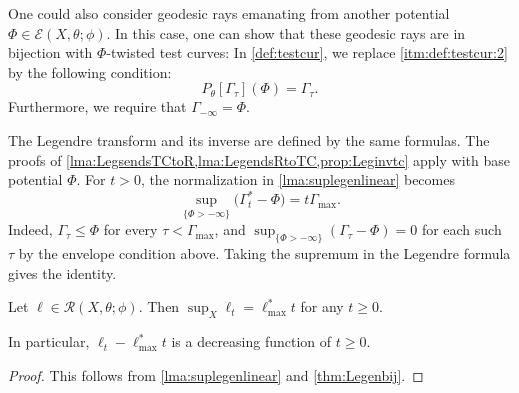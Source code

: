 \begin{remark}\label{rmk:testcurve:L815}
    One could also consider geodesic rays emanating from another potential $\Phi \in \mathcal{E}(X,\theta;\phi)$. In this case, one can show that these geodesic rays are in bijection with $\Phi$-twisted test curves: In \cref{def:testcur}, we replace \ref{itm:def:testcur:2} by the following condition:
    \[
        P_{\theta}\left[\Gamma_{\tau}\right](\Phi)=\Gamma_{\tau}.
    \]
    Furthermore, we require that $\Gamma_{-\infty}=\Phi$.

    The Legendre transform and its inverse are defined by the same formulas. The proofs of \cref{lma:LegsendsTCtoR,lma:LegendsRtoTC,prop:Leginvtc} apply with base potential $\Phi$. For $t>0$, the normalization in \cref{lma:suplegenlinear} becomes
    \[
        \sup_{\{\Phi>-\infty\}}\bigl(\Gamma^*_t-\Phi\bigr)=t\Gamma_{\max}.
    \]
    Indeed, $\Gamma_\tau\leq\Phi$ for every $\tau<\Gamma_{\max}$, and $\sup_{\{\Phi>-\infty\}}(\Gamma_\tau-\Phi)=0$ for each such $\tau$ by the envelope condition above. Taking the supremum in the Legendre formula gives the identity.
\end{remark}

\begin{corollary}\label{cor:reltestcursuplinear}
    Let $\ell\in \mathcal{R}(X,\theta;\phi)$. Then $\sup_X \ell_t=\ell^*_{\max}t$ for any $t\geq 0$.

    In particular, $\ell_t-\ell^*_{\max}t$ is a decreasing function of $t\geq 0$.
\end{corollary}
\begin{proof}
    This follows from \cref{lma:suplegenlinear} and \cref{thm:Legenbij}.
\end{proof}

